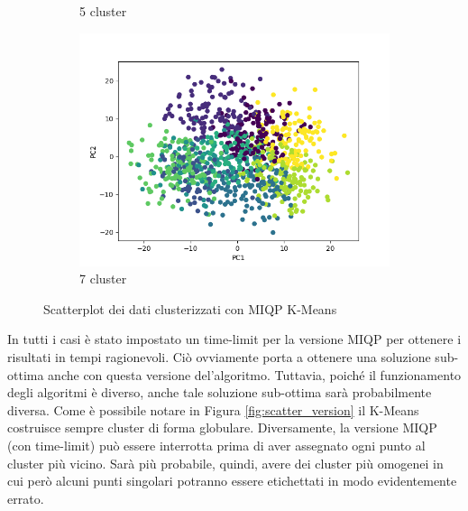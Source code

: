 \documentclass{article}
\begin{document}
\begin{figure}[h]
\begin{subfigure}[b]{0.32\linewidth}
         \caption{5 cluster}
     \end{subfigure}
     \begin{subfigure}[b]{0.32\linewidth}
         \centering
         \includegraphics[width=\linewidth]{../results/plots/scatter_k7}
         \caption{7 cluster}
     \end{subfigure}
     \caption{Scatterplot dei dati clusterizzati con MIQP K-Means}
     \label{fig:scatter_cluster}
    \end{figure}
    In tutti i casi è stato impostato un time-limit per la versione MIQP per ottenere i risultati in tempi ragionevoli. Ciò ovviamente porta a ottenere una soluzione sub-ottima anche con questa versione del'algoritmo. Tuttavia, poiché il funzionamento degli algoritmi è diverso, anche tale soluzione sub-ottima sarà probabilmente diversa. Come è possibile notare in Figura \ref{fig:scatter_version} il K-Means costruisce sempre cluster di forma globulare. Diversamente, la versione MIQP (con time-limit) può essere interrotta prima di aver assegnato ogni punto al cluster più vicino. Sarà più probabile, quindi, avere dei cluster più omogenei in cui però alcuni punti singolari potranno essere etichettati in modo evidentemente errato.
\end{document}
